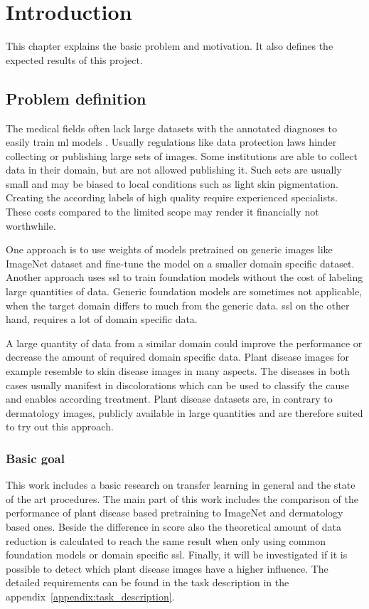 \chapter{Introduction}
This chapter explains the basic problem and motivation. It also defines the expected results of this project.

\section{Problem definition}

The medical fields often lack large datasets with the annotated diagnoses to easily train \gls{ml} models \autocite{castro2019}.
Usually regulations like data protection laws hinder collecting or publishing large sets of images. Some institutions are able to collect data in their domain, but are not allowed publishing it. Such sets are usually small and may be biased to local conditions such as light skin pigmentation.
Creating the according labels of high quality require experienced specialists. These costs compared to the limited scope may render it financially not worthwhile.

One approach is to use weights of models pretrained on generic images like ImageNet dataset and fine-tune the model on a smaller domain specific dataset. Another approach uses \gls{ssl} to train foundation models without the cost of labeling large quantities of data. 
Generic foundation models are sometimes not applicable, when the target domain differs to much from the generic data.%
\gls{ssl} on the other hand, requires a lot of domain specific data.

A large quantity of data from a similar domain could improve the performance or decrease the amount of required domain specific data. 
Plant disease images for example resemble to skin disease images in many aspects. The diseases in both cases usually manifest in discolorations which can be used to classify the cause and enables according treatment.
Plant disease datasets are, in contrary to dermatology images, publicly available in large quantities and are therefore suited to try out this approach.


\subsection{Basic goal}
This work includes a basic research on transfer learning in general and the state of the art procedures. 
The main part of this work includes the comparison of the performance of plant disease based pretraining to ImageNet and dermatology based ones. Beside the difference in score also the theoretical amount of data reduction is calculated to reach the same result when only using common foundation models or domain specific \gls{ssl}. 
Finally, it will be investigated if it is possible to detect which plant disease images have a higher influence.
The detailed requirements can be found in the task description in the appendix~\ref{appendix:task_description}.

